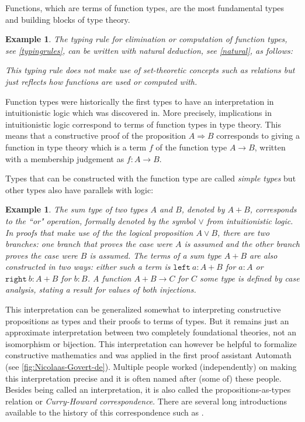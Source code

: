 \documentclass[12pt,a4paper,twoside,xetex]{book} %
\newcommand{\keyword}[1]{\emph{#1}\index{#1}}
\newtheorem{example}[theorem]{Example}
\begin{document}
Functions, which are terms of function types, are the most fundamental types and 
building blocks of type theory. 

\begin{example}\label{functionel}
The typing rule for elimination or computation of function types, see 
\cref{typingrules}, can be written with natural deduction, see \cref{natural}, as follows:
\begin{prooftree}
    \end{prooftree}
This typing rule does not make use of set-theoretic concepts such as relations 
but just reflects how functions are used or computed with.
\end{example}
    
    
Function types were historically the first types to have an interpretation in 
intuitionistic logic \cite{Heyting1930} which was discovered 
in\cite{Curry1934Nov}. More precisely, implications in intuitionistic logic 
correspond to terms of function types in type theory. This means that a 
constructive proof of the proposition $A \Rightarrow B$ corresponds to giving a 
function  in type theory which is a term $f$ of the function type $ A 
\rightarrow B$, written with a membership judgement as $f: A \rightarrow B$. 

Types that can be constructed with the function type are called \keyword{simple 
types} but other types also have parallels with logic:

\begin{example}
The \keyword{sum type} of two types $A$ and $B$, denoted by $A+B$, corresponds 
to the ``or" operation, formally denoted by the symbol $\vee$ from 
intuitionistic logic. In proofs that make use of the the logical proposition $A 
\vee B$, there are two branches: one branch that proves the case were 
$A$ is assumed and the other branch proves the case were $B$ is assumed. The terms of a sum type
$A+B$ are also constructed in two ways: either such a term is $\texttt{left}\ 
a:A+B$ for $a:A$ or $\texttt{right}\ b:A+B$ for $b:B$. A function 
$A+B\rightarrow C$ for $C$ some type is defined by case analysis, stating a 
result for values of both injections.
\end{example}

This interpretation can be generalized somewhat to interpreting constructive 
propositions as types and their proofs to terms of types. But it remains just an 
approximate interpretation between two completely foundational theories, not an 
isomorphism or bijection. This interpretation can however be helpful to 
formalize constructive mathematics and was applied in the first proof assistant 
Automath \cite{DeBruijn1970} (see \cref{fig:Nicolaas-Govert-de}). Multiple 
people worked (independently) on making this interpretation precise and it is 
often named after (some of) these people. Besides being called an 
interpretation, it is also called the propositions-as-types relation or 
\keyword{Curry-Howard correspondence}. There are several long introductions 
available to the history of this correspondence such as \cite{BibEntry2019Apr}.
\end{document}
